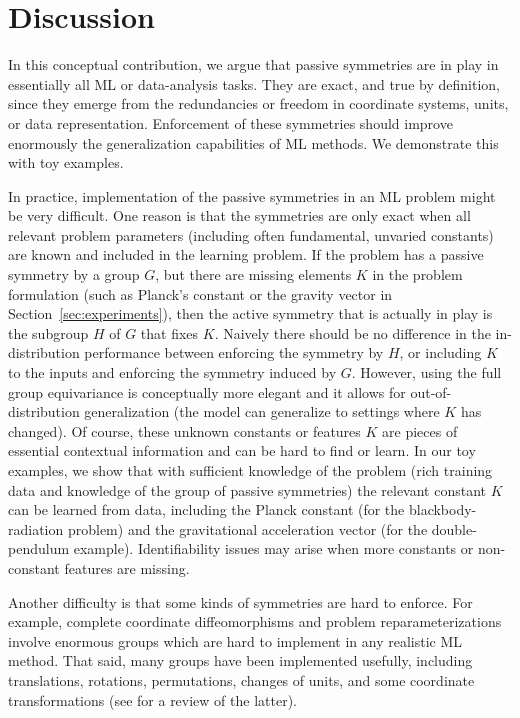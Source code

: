 \documentclass{article} %
\newcommand{\sectionname}{Section}
\newcommand{\secref}[1]{\sectionname~\ref{#1}}
\begin{document}
\section{Discussion}\label{sec:discussion}
In this conceptual contribution,
we argue that passive symmetries are in play in essentially all ML or data-analysis tasks.
They are exact, and true by definition, since they emerge from the redundancies or freedom in coordinate systems, units, or data representation.
Enforcement of these symmetries should improve enormously the generalization capabilities of ML methods.
We demonstrate this with toy examples.

In practice, implementation of the passive symmetries in an ML problem might be very difficult.
One reason is that the symmetries are only exact when all relevant problem parameters (including often fundamental, unvaried constants) are known and included in the learning problem.
If the problem has a passive symmetry by a group $G$, but there are missing elements $K$ in the problem formulation (such as Planck's constant or the gravity vector in \secref{sec:experiments}), then the active symmetry that is actually in play is the subgroup $H$ of $G$ that fixes $K$. 
Naively there should be no difference in the in-distribution performance between enforcing the symmetry by $H$, or including $K$ to the inputs and enforcing the symmetry induced by $G$. 
However, using the full group equivariance is conceptually more elegant and it allows for out-of-distribution generalization (the model can generalize to settings where  $K$ has changed).
Of course, these unknown constants or features $K$ are pieces of essential contextual information and can be hard to find or learn. 
In our toy examples, we show that with sufficient knowledge of the problem (rich training data and knowledge of the group of passive symmetries) the relevant constant $K$ can be learned from data, including the Planck constant (for the blackbody-radiation problem) and the gravitational acceleration vector (for the double-pendulum example).
Identifiability issues may arise when more constants or non-constant features are missing.

Another difficulty is that some kinds of symmetries are hard to enforce.
For example, complete coordinate diffeomorphisms and problem reparameterizations involve enormous groups which are hard to implement in any realistic ML method.
That said, many groups have been implemented usefully, including translations, rotations, permutations, changes of units, and some coordinate transformations (see \citealt{weiler} for a review of the latter). 
\end{document}
